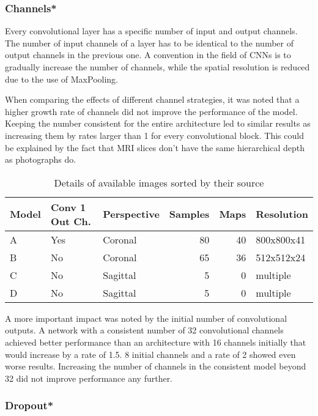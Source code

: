 \subsubsection{Channels*}

Every convolutional layer has a specific number of input and output channels. The number of input channels of a layer has to be identical to the number of output channels in the previous one. A convention in the field of CNNs is to gradually increase the number of channels, while the spatial resolution is reduced due to the use of MaxPooling.

When comparing the effects of different channel strategies, it was noted that a higher growth rate of channels did not improve the performance of the model. Keeping the number consistent for the entire architecture led to similar results as increasing them by rates larger than 1 for every convolutional block. This could be explained by the fact that MRI slices don't have the same hierarchical depth as photographs do.

\begin{table}[h!]
\centering
\begin{tabular}{l l l r r l}
    Model & Conv 1 Out Ch. & Perspective & Samples & Maps & Resolution \\
    \hline
    A     & Yes         & Coronal     & 80      & 40   & 800x800x41 \\
    B     & No          & Coronal     & 65      & 36   & 512x512x24 \\
    C     & No          & Sagittal    & 5       & 0    & multiple \\
    D     & No          & Sagittal    & 5       & 0    & multiple \\
\end{tabular}
\caption{Details of available images sorted by their source}
\end{table}

A more important impact was noted by the initial number of convolutional outputs. A network with a consistent number of 32 convolutional channels achieved better performance than an architecture with 16 channels initially that would increase by a rate of 1.5. 8 initial channels and a rate of 2 showed even worse results. Increasing the number of channels in the consistent model beyond 32 did not improve performance any further.

\subsubsection{Dropout*}

